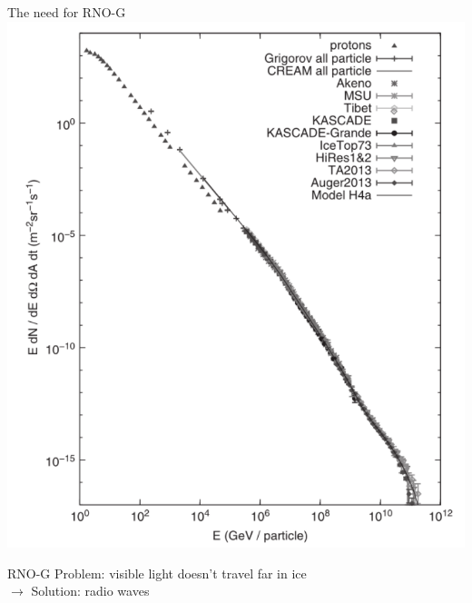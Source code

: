 \documentclass{beamer}
\begin{document}
\begin{frame}{The need for RNO-G}
  \centering
  \includegraphics[height=0.9\textheight]{figures/cosmic_ray_flux.pdf}
\end{frame}
\begin{frame}{RNO-G}
  Problem: visible light doesn't travel far in ice\\
  $\rightarrow$ Solution: radio waves
\end{frame}
\end{document}
